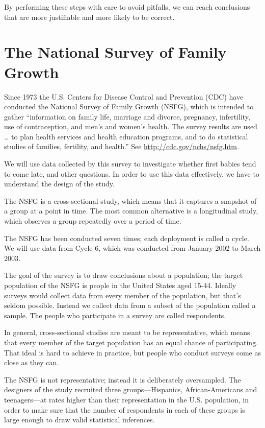 \documentclass[]{book}
\begin{document}
By performing these steps with care to
avoid pitfalls, we can reach conclusions that are more justifiable and
more likely to be correct.

\hypertarget{the-national-survey-of-family-growth}{%
\section{The National Survey of Family Growth}\label{the-national-survey-of-family-growth}}

Since 1973 the U.S. Centers for Disease
Control and Prevention (CDC) have conducted the National Survey of
Family Growth (NSFG), which is intended to gather ``information on family
life, marriage and divorce, pregnancy, infertility, use of
contraception, and men's and women's health. The survey results are used
\ldots{} to plan health services and health education programs, and to do
statistical studies of families, fertility, and health.'' See
\url{http://cdc.gov/nchs/nsfg.htm}.

We will use data collected by this survey
to investigate whether first babies tend to come late, and other
questions. In order to use this data effectively, we have to understand
the design of the study.

The NSFG is a cross-sectional study, which means that
it captures a snapshot of a group at a point in time. The most common
alternative is a longitudinal
study, which observes a group repeatedly over a period of time.

The NSFG has been conducted seven times;
each deployment is called a cycle.
We will use data from Cycle 6, which was conducted from January 2002 to
March 2003.

The goal of the survey is to draw
conclusions about a population;
the target population of the NSFG is people in the United States aged
15-44. Ideally surveys would collect data from every member of the
population, but that's seldom possible. Instead we collect data from a
subset of the population called a sample. The people who participate in a
survey are called respondents.

In general, cross-sectional studies are
meant to be representative, which
means that every member of the target population has an equal chance of
participating. That ideal is hard to achieve in practice, but people who
conduct surveys come as close as they can.

The NSFG is not representative; instead
it is deliberately oversampled.
The designers of the study recruited three groups---Hispanics,
African-Americans and teenagers---at rates higher than their
representation in the U.S. population, in order to make sure that the
number of respondents in each of these groups is large enough to draw
valid statistical inferences.
\end{document}
